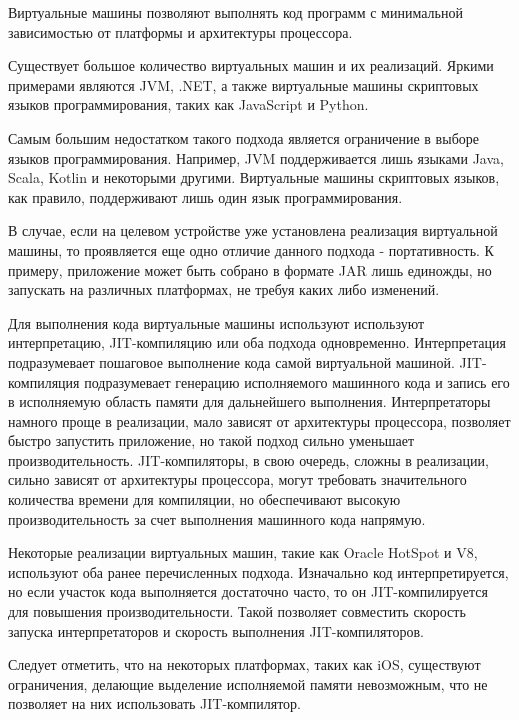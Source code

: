 Виртуальные машины позволяют выполнять код программ с минимальной зависимостью от платформы и архитектуры процессора.

Существует большое количество виртуальных машин и их реализаций.
Яркими примерами являются JVM, .NET, а также виртуальные машины скриптовых языков программирования, таких как JavaScript и Python.

Самым большим недостатком такого подхода является ограничение в выборе языков программирования. 
Например, JVM поддерживается лишь языками Java, Scala, Kotlin и некоторыми другими. 
Виртуальные машины скриптовых языков, как правило, поддерживают лишь один язык программирования.

В случае, если на целевом устройстве уже установлена реализация виртуальной машины, то проявляется еще одно отличие данного подхода - портативность. 
К примеру, приложение может быть собрано в формате JAR лишь единожды, но запускать на различных платформах, не требуя каких либо изменений.

Для выполнения кода виртуальные машины используют используют интерпретацию, JIT-компиляцию или оба подхода одновременно.
Интерпретация подразумевает пошаговое выполнение кода самой виртуальной машиной.
JIT-компиляция подразумевает генерацию исполняемого машинного кода и запись его в исполняемую область памяти для дальнейшего выполнения.
Интерпретаторы намного проще в реализации, мало зависят от архитектуры процессора, позволяет быстро запустить приложение, но такой подход сильно уменьшает производительность.
JIT-компиляторы, в свою очередь, сложны в реализации, сильно зависят от архитектуры процессора, могут требовать значительного количества времени для компиляции, но обеспечивают высокую производительность за счет выполнения машинного кода напрямую.

Некоторые реализации виртуальных машин, такие как Oracle HotSpot и V8, используют оба  ранее перечисленных подхода. 
Изначально код интерпретируется, но если участок кода выполняется достаточно часто, то он JIT-компилируется для повышения производительности. 
Такой позволяет совместить скорость запуска интерпретаторов и скорость выполнения JIT-компиляторов.

Следует отметить, что на некоторых платформах, таких как iOS, существуют ограничения, делающие выделение исполняемой памяти невозможным, что не позволяет на них использовать JIT-компилятор.
